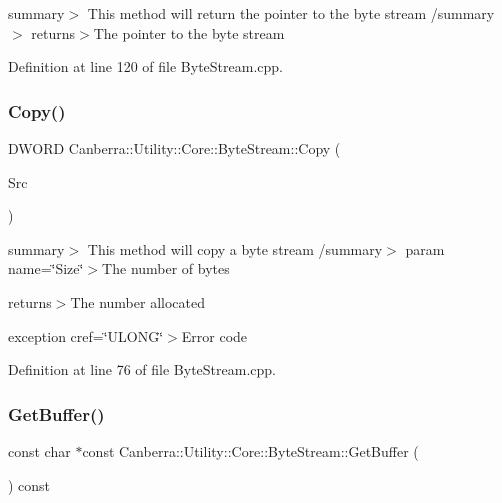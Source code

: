 summary$>$ This method will return the pointer to the byte stream /summary$>$ returns$>$The pointer to the byte stream

Definition at line 120 of file Byte\+Stream.\+cpp.

\mbox{\label{class_canberra_1_1_utility_1_1_core_1_1_byte_stream_a77b71d73dd8ca721e458728a8b684446_a77b71d73dd8ca721e458728a8b684446}} 
\subsubsection{\texorpdfstring{Copy()}{Copy()}\hspace{0.1cm}{\footnotesize\ttfamily [3/3]}}
{\footnotesize\ttfamily D\+W\+O\+RD Canberra\+::\+Utility\+::\+Core\+::\+Byte\+Stream\+::\+Copy (\begin{DoxyParamCaption}\item[{\hyperlink{class_canberra_1_1_utility_1_1_core_1_1_byte_stream}{Byte\+Stream} \&}]{Src }\end{DoxyParamCaption})}

summary$>$ This method will copy a byte stream /summary$>$ param name=\char`\"{}\+Size\char`\"{}$>$The number of bytes

returns$>$The number allocated

exception cref=\char`\"{}\+U\+L\+O\+N\+G\char`\"{}$>$Error code

Definition at line 76 of file Byte\+Stream.\+cpp.

\mbox{\label{class_canberra_1_1_utility_1_1_core_1_1_byte_stream_a8e29355fc0049cc2a715c0dd4da71903_a8e29355fc0049cc2a715c0dd4da71903}} 
\subsubsection{\texorpdfstring{Get\+Buffer()}{GetBuffer()}}
{\footnotesize\ttfamily const char $\ast$const Canberra\+::\+Utility\+::\+Core\+::\+Byte\+Stream\+::\+Get\+Buffer (\begin{DoxyParamCaption}{ }\end{DoxyParamCaption}) const}

